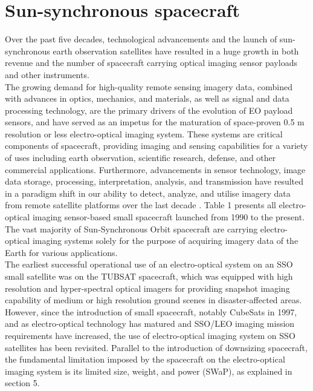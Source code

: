 \documentclass[final,5p,times,sort&compress,twocolumn]{elsarticle}
\begin{document}
\section{Sun-synchronous spacecraft}
\label{Section 3}
Over the past five decades, technological advancements and the launch of sun-synchronous earth observation satellites have resulted in a huge growth in both revenue and the number of spacecraft carrying optical imaging sensor payloads and other instruments.  \\
The growing demand for high-quality remote sensing imagery data, combined with advances in optics, mechanics, and materials, as well as signal and data processing technology, are the primary drivers of the evolution of EO payload sensors, and have served as an impetus for the maturation of space-proven 0.5 m resolution or less \cite{demirel2005one, sandau2010status} electro-optical imaging system. These systems are critical components of spacecraft, providing imaging and sensing capabilities for a variety of uses including earth observation, scientific research, defense, and other commercial applications. Furthermore, advancements in sensor technology, image data storage, processing, interpretation, analysis, and transmission have resulted in a paradigm shift in our ability to detect, analyze, and utilise imagery data from remote satellite platforms over the last decade \cite{arthur1997}. Table 1 presents all electro-optical imaging sensor-based small spacecraft launched from 1990 to the present.\\
The vast majority of Sun-Synchronous Orbit spacecraft are carrying electro-optical imaging systems solely for the purpose of acquiring imagery data of the Earth for various applications.\\
The earliest successful operational use of an electro-optical system on an SSO small satellite was on the TUBSAT spacecraft, which was equipped with high resolution and hyper-spectral optical imagers \cite{roemer2003flight} for providing snapshot imaging capability of medium or high resolution ground scenes in disaster-affected areas. \\
However, since the introduction of small spacecraft, notably CubeSats in 1997, and as electro-optical technology has matured and SSO/LEO imaging mission requirements have increased, the use of electro-optical imaging system on SSO satellites has been revisited. Parallel to the introduction of downsizing spacecraft, the fundamental limitation imposed by the spacecraft on the electro-optical imaging system is its limited size, weight, and power (SWaP), as explained in section 5.  \\
\end{document}
